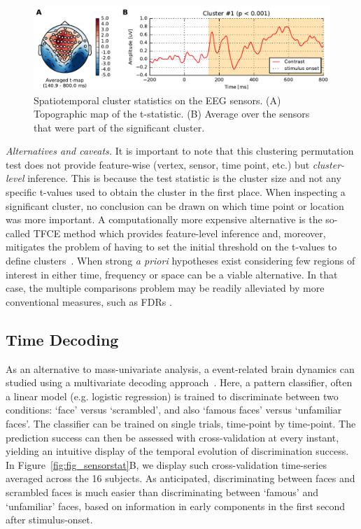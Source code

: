\begin{figure}
\centering
\includegraphics[width=\linewidth]{figures/spatiotemporal_stats_cluster_highpass-NoneHz-00.pdf}
\caption[Spatiotemporal cluster statistics on EEG sensors.]{Spatiotemporal cluster statistics on the EEG sensors. (A) Topographic map of the t-statistic. (B) Average over the sensors that were part of the significant cluster.}
\label{fig:stclusterstats}
\end{figure}
\emph{Alternatives and caveats.} It is important to note that this clustering permutation test does not provide feature-wise (vertex, sensor, time point, etc.) but \emph{cluster-level} inference. This is because the test statistic is the cluster size and not any specific t-values used to obtain the cluster in the first place. When inspecting a significant cluster, no conclusion can be drawn on which time point or location was more important. A computationally more expensive alternative is the so-called TFCE method which provides feature-level inference and, moreover, mitigates the problem of having to set the initial threshold on the t-values to define clusters~\citep{TFCE}. When strong \emph{a priori} hypotheses exist considering few regions of interest in either time, frequency or space can be a viable alternative. In that case, the multiple comparisons problem may be readily alleviated by more conventional measures, such as \acp{FDR} \citep{FDR}.

\subsection{Time Decoding}

As an alternative to mass-univariate analysis, a event-related brain dynamics can studied using a multivariate decoding approach~\citep{ramkumar2013feature,king2014characterizing}. Here, a pattern classifier, often a linear model (e.g. logistic regression) is trained to discriminate between two conditions: `face' versus `scrambled', and also `famous faces' versus `unfamiliar faces'. The classifier can be trained on single trials, time-point by time-point. The prediction success can then be assessed with cross-validation at every instant, yielding an intuitive display of the temporal evolution of discrimination success. In Figure~\ref{fig:fig_sensorstat}B, we display such cross-validation time-series averaged across the 16 subjects. As anticipated, discriminating between faces and scrambled faces is much easier than discriminating between `famous' and `unfamiliar' faces, based on information in early components in the first second after stimulus-onset.

